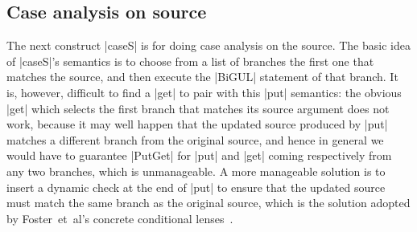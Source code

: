 \documentclass[fleqn]{llncs}
\newcommand{\beforefigure}{\setlength{\mathindent}{0em}}
\newcommand{\afterfigure}{\vskip-5ex}
\begin{document}
\subsection{Case analysis on source}
\label{sec:source-case}

%
%

The next construct |caseS| is for doing case analysis on the source.
The basic idea of |caseS|'s semantics is to choose from a list of branches the first one that matches the source, and then execute the |BiGUL| statement of that branch.
It is, however, difficult to find a |get| to pair with this |put| semantics: the obvious |get| which selects the first branch that matches its source argument does not work, because it may well happen that the updated source produced by |put| matches a different branch from the original source, and hence in general we would have to guarantee |PutGet| for |put| and |get| coming respectively from any two branches, which is unmanageable.
A more manageable solution is to insert a dynamic check at the end of |put| to ensure that the updated source must match the same branch as the original source, which is the solution adopted by Foster~et~al's concrete conditional lenses~\cite[Section~6.1]{Foster-lenses}.
\end{document}
